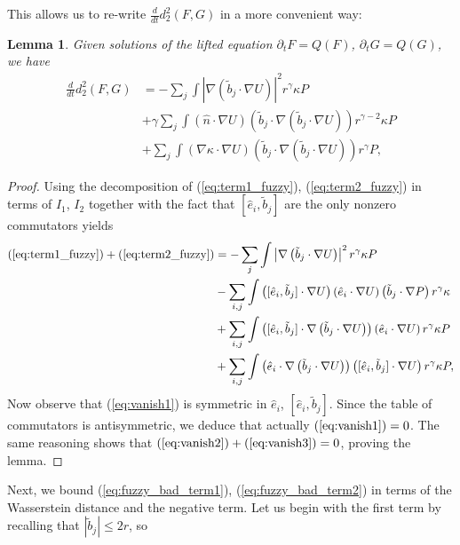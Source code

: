 \documentclass[10pt,oneside]{amsart}
\numberwithin{equation}{section}
\numberwithin{definition}{section}
\numberwithin{theorem}{section}
\newtheorem{lemma}{Lemma}
\numberwithin{lemma}{section}
\begin{document}
%
% 
This allows us to re-write $\frac{d}{dt}d_2^2(F,G)$ in a more convenient way:
%
% 
\begin{lemma}\label{lem:expression_dissip}
  Given solutions of the lifted equation $\partial_tF = Q(F)$, $\partial_tG = Q(G)$, we have
  \begin{align}
    \frac{d}{dt}d_2^2(F,G) &\nonumber
    = -\sum_{j}\int\left|\nabla\left(\tilde{b}_{j}\cdot\nabla U\right)\right|^{2}r^{\gamma}\kappa P	\nonumber\\
    &+\gamma\sum_{j}\int\left(\hat{n}\cdot\nabla U\right)\left(\tilde{b}_{j}\cdot\nabla\left(\tilde{b}_{j}\cdot\nabla U\right)\right)r^{\gamma-2}\kappa P \label{eq:fuzzy_bad_term1} \\
  & +\sum_{j}\int\left(\nabla \kappa\cdot\nabla U\right)\left(\tilde{b}_{j}\cdot\nabla\left(\tilde{b}_{j}\cdot\nabla U\right)\right) r^\gamma P, 
  \label{eq:fuzzy_bad_term2}
  \end{align}
\end{lemma}
% 
\begin{proof}
  Using the decomposition of (\ref{eq:term1_fuzzy}), (\ref{eq:term2_fuzzy}) in terms of $I_1$, $I_2$ together with the fact that $[\hat e_i,\tilde b_j]$ are the only nonzero commutators yields
  \begin{align}
    (\ref{eq:term1_fuzzy})+(\ref{eq:term2_fuzzy}) & 
    =-\sum_{j}\int\left|\nabla\left(\tilde{b}_{j}\cdot\nabla U\right)\right|^{2}r^{\gamma}\kappa P \nonumber	\\
    & -\sum_{i,j}\int\left([\hat{e}_{i},\tilde{b}_{j}]\cdot\nabla U\right)\left(\hat{e}_{i}\cdot\nabla U\right)\left(\tilde{b}_{j}\cdot\nabla P\right)r^{\gamma}\kappa \label{eq:vanish1}\\
    & +\sum_{i,j}\int\left([\hat{e}_{i},\tilde{b}_{j}]\cdot\nabla\left(\tilde{b}_{j}\cdot\nabla U\right)\right)\left(\hat{e}_{i}\cdot\nabla U\right)r^{\gamma}\kappa P\label{eq:vanish2}\\
    & +\sum_{i,j}\int\left(\hat{e}_{i}\cdot\nabla\left(\tilde{b}_{j}\cdot\nabla U\right)\right)\left([\hat{e}_{i},\tilde{b}_{j}]\cdot\nabla U\right)r^{\gamma}\kappa P,\label{eq:vanish3}
  \end{align}
  Now observe that (\ref{eq:vanish1}) is symmetric in $\hat{e}_{i}$, $[\hat{e}_{i},\tilde{b}_{j}]$. Since the table of commutators is antisymmetric, we deduce that actually $(\ref{eq:vanish1})=0$. The same reasoning shows that $\ensuremath{(\ref{eq:vanish2})+(\ref{eq:vanish3})=0}$, proving the lemma.
\end{proof}
%
%
Next, we bound (\ref{eq:fuzzy_bad_term1}), (\ref{eq:fuzzy_bad_term2}) in terms of the Wasserstein distance and the negative term. Let us begin with the first term by recalling that $|\tilde b_j|\leq 2r$, so 
\end{document}
